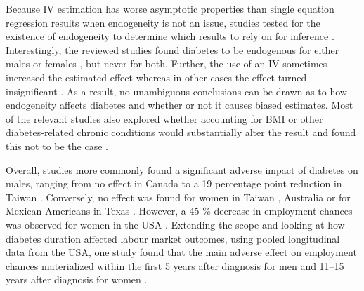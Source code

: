 Because \ac{IV} estimation has worse asymptotic properties than single equation regression results when endogeneity is not an issue, studies tested for the existence of endogeneity to determine which results to rely on for inference \parencite{Brown2005,Minor2011,Latif2009,Lin2011b}. Interestingly, the reviewed studies found diabetes to be endogenous for either males \parencite{Latif2009} or females \parencite{Brown2005,Minor2011}, but never for both. Further, the use of an \ac{IV} sometimes increased the estimated effect\parencite{Minor2011,Lin2011b} whereas in other cases the effect turned insignificant \parencite{Brown2005,Latif2009}. As a result, no unambiguous conclusions can be drawn as to how endogeneity affects diabetes and whether or not it causes biased estimates. Most of the relevant studies also explored whether accounting for \ac{BMI} or other diabetes-related chronic conditions would substantially alter the result and found this not to be the case \parencite{Brown2005,Latif2009,Minor2013}.

Overall, studies more commonly found a significant adverse impact of diabetes on males, ranging from no effect in Canada \parencite{Latif2009} to a 19 percentage point reduction in Taiwan \parencite{Lin2011b}. Conversely, no effect was found for women in Taiwan  \parencite{Lin2011b}, Australia  \parencite{Zhang2009} or for Mexican Americans in Texas \parencite{Brown2005}. However, a 45 \% decrease in employment chances was observed for women in the USA \parencite{Minor2011}. Extending the scope and looking at how diabetes duration affected labour market outcomes, using pooled longitudinal data from the USA, one study found that the main adverse effect on employment chances materialized within the first 5 years after diagnosis for men and 11--15 years after diagnosis for women \parencite{Minor2013}.

